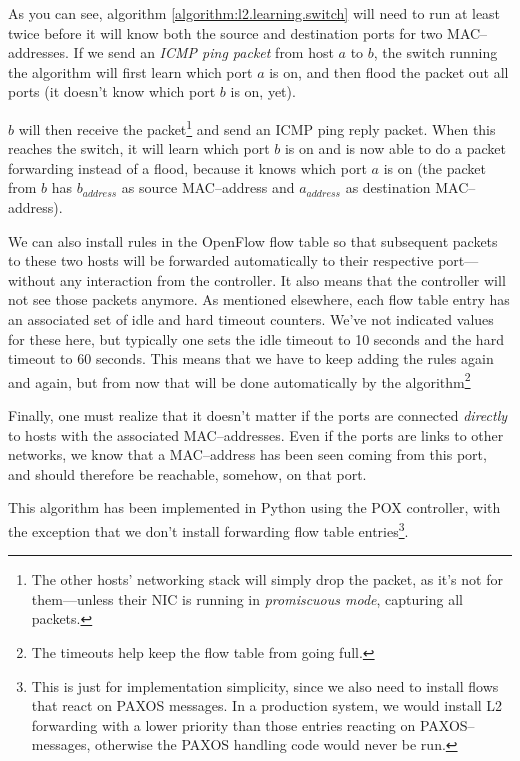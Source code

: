 As you can see, algorithm \ref{algorithm:l2.learning.switch} will need to
run at least twice before it will know both the source and destination ports
for two MAC--addresses.  If we send an \textit{\acs{ICMP} ping packet} from
host $a$ to $b$, the switch running the algorithm will first learn which port
$a$ is on, and then flood the packet out all ports (it doesn't know which
port $b$ is on, yet).

$b$ will then receive the packet\footnote{The other hosts' networking stack
will simply drop the packet, as it's not for them---unless their \acs{NIC} is
running in \textit{promiscuous mode}, capturing all packets.} and send an \acs{ICMP}
ping reply packet.  When this reaches the switch, it will learn which port
$b$ is on and is now able to do a packet forwarding instead of a flood,
because it knows which port $a$ is on (the packet from $b$ has $b_{address}$ as
source MAC--address and $a_{address}$ as destination MAC--address).

We can also install rules in the OpenFlow flow table so that
subsequent packets to these two hosts will be forwarded automatically to
their respective port---without any interaction from the controller.  It
also means that the controller will not see those packets anymore.  As
mentioned elsewhere, each flow table entry has an associated set of idle and
hard timeout counters.  We've not indicated values for these here, but
typically one sets the idle timeout to 10 seconds and the hard timeout to 60
seconds.  This means that we have to keep adding the rules again and again,
but from now that will be done automatically by the algorithm\footnote{The
timeouts help keep the flow table from going full.}

Finally, one must realize that it doesn't matter if the ports are connected
\textit{directly} to hosts with the associated MAC--addresses.  Even if the
ports are links to other networks, we know that a MAC--address has been seen
coming from this port, and should therefore be reachable, somehow, on that
port.

This algorithm has been implemented in Python using the POX controller, with
the exception that we don't install forwarding flow table
entries\footnote{This is just for implementation simplicity, since we also
need to install flows that react on PAXOS messages.  In a production
system, we would install L2 forwarding with a lower priority than those
entries reacting on PAXOS--messages, otherwise the PAXOS handling code would
never be run.}.
